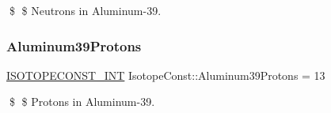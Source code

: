 \$ \$ Neutrons in Aluminum-\/39. \mbox{\label{group___isotope_const-_aluminum-_al39_ga64c68f947c66688171d6fb1320473848}} 
\subsubsection{\texorpdfstring{Aluminum39\+Protons}{Aluminum39Protons}}
{\footnotesize\ttfamily \mbox{\hyperlink{group___isotope_const-_macros_ga5f18360b3e99483a35c32d789e62621c}{I\+S\+O\+T\+O\+P\+E\+C\+O\+N\+S\+T\+\_\+\+I\+NT}} Isotope\+Const\+::\+Aluminum39\+Protons = 13}

\$ \$ Protons in Aluminum-\/39. 